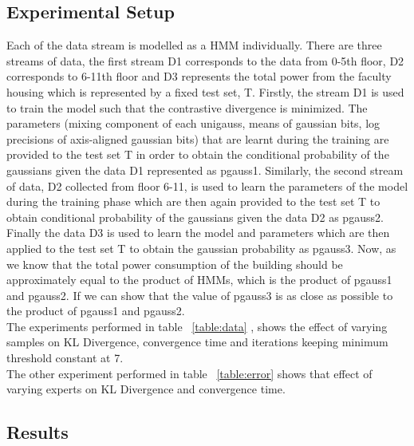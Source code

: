 \documentclass[10pt, conference, compsocconf]{IEEEtran}
\begin{document}
\subsection{ Experimental Setup } 
Each of the data stream is modelled as a HMM individually. There are three streams of data, the first stream D1 corresponds to the data from 0-5th floor, D2 corresponds to 6-11th floor and D3 represents the total power from the faculty housing which is represented by a fixed test set, T. Firstly, the stream D1 is used to train the model such that the contrastive divergence is minimized. The parameters (mixing component of each unigauss, means of gaussian bits, log precisions of axis-aligned gaussian bits) that are learnt during the training are provided to the test set T in order to obtain the conditional probability of the gaussians given the data D1 represented as pgauss1. Similarly, the second stream of data, D2 collected from floor 6-11, is used to learn the parameters of the model during the training phase which are then again provided to the test set T to obtain conditional probability of the gaussians given the data D2 as pgauss2. Finally the data D3 is used to learn the model and parameters which are then applied to the test set T to obtain the gaussian probability as pgauss3. Now, as we know that the total power consumption of the building should be approximately equal to the product of HMMs, which is the product of pgauss1 and pgauss2. If we can show that the value of pgauss3 is as close as possible to the product of pgauss1 and pgauss2.\\
The experiments performed in table ~\ref{table:data} , shows the effect of varying samples on KL Divergence, convergence time and iterations keeping minimum threshold constant at 7.\\
The other experiment performed in table ~\ref{table:error} shows that effect of varying experts on KL Divergence and convergence time.

\subsection{ Results }
\end{document}
